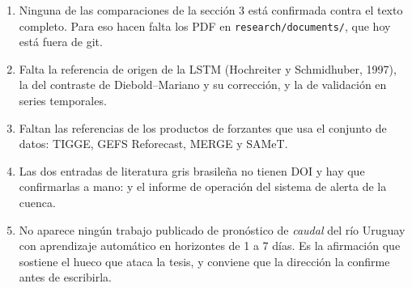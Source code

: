 \documentclass{../comun/tesisuba}
\begin{document}
\begin{enumerate}[leftmargin=*, itemsep=3pt]
  \item Ninguna de las comparaciones de la sección 3 está confirmada contra el texto completo.
        Para eso hacen falta los PDF en \texttt{research/documents/}, que hoy está fuera de git.
  \item Falta la referencia de origen de la LSTM (Hochreiter y Schmidhuber, 1997), la del
        contraste de Diebold--Mariano y su corrección, y la de validación en series temporales.
  \item Faltan las referencias de los productos de forzantes que usa el conjunto de datos: TIGGE,
        GEFS Reforecast, MERGE y SAMeT.
  \item Las dos entradas de literatura gris brasileña no tienen DOI y hay que confirmarlas a mano:
        \citet{mattiuzi-2021-m5-uruguai} y el informe de operación del sistema de alerta de la
        cuenca.
  \item No aparece ningún trabajo publicado de pronóstico de \emph{caudal} del río Uruguay con
        aprendizaje automático en horizontes de 1 a 7 días. Es la afirmación que sostiene el hueco
        que ataca la tesis, y conviene que la dirección la confirme antes de escribirla.
\end{enumerate}

\bibliografia
\end{document}
